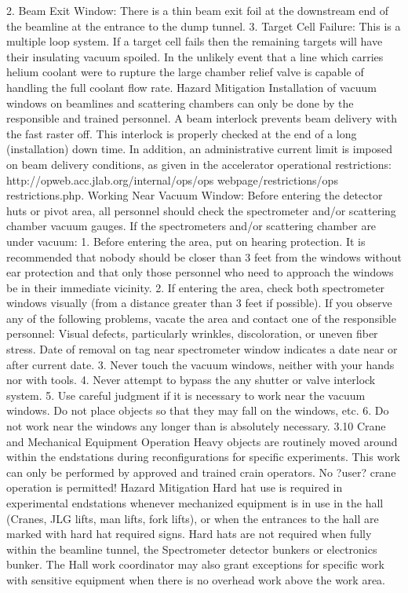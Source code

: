 {	2.  	Beam Exit Window: There is a thin beam exit foil at the downstream end of the beamline at the entrance to the dump tunnel.
	3. 	Target Cell Failure: This is a multiple loop system. If a target cell fails then the remaining targets will have their insulating vacuum spoiled. In the unlikely event that a line which carries helium coolant were to rupture the large chamber relief valve is capable of handling the full coolant flow rate.
Hazard Mitigation	
	Installation of vacuum windows on beamlines and scattering chambers can only be done by the responsible and trained personnel. A beam interlock prevents beam delivery with the fast raster off. This interlock is properly checked at the end of a long (installation) down time. In addition, an administrative current limit is imposed on beam delivery conditions, as given in the accelerator operational restrictions: http://opweb.acc.jlab.org/internal/ops/ops webpage/restrictions/ops restrictions.php.
	Working Near Vacuum Window: Before entering the detector huts or pivot area, all personnel should check the spectrometer and/or scattering chamber vacuum gauges. If the spectrometers and/or scattering chamber are under vacuum:
	1. 	Before entering the area, put on hearing protection. It is recommended that nobody should be closer than 3 feet from the windows without ear protection and that only those personnel who need to approach the windows be in their immediate vicinity.
	2. 	If entering the area, check both spectrometer windows visually (from a distance greater than 3 feet if possible). If you observe any of the following problems, vacate the area and contact one of the responsible personnel: Visual defects, particularly wrinkles, discoloration, or uneven fiber stress. Date of removal on tag near spectrometer window indicates a date near or after current date.
	3. 	Never touch the vacuum windows, neither with your hands nor with tools.
	4. 	Never attempt to bypass the any shutter or valve interlock system.
	5. 	Use careful judgment if it is necessary to work near the vacuum windows. Do not place objects so that they may fall on the windows, etc.
	6.	 Do not work near the windows any longer than is absolutely necessary.
3.10 	Crane and Mechanical Equipment Operation
	Heavy objects are routinely moved around within the endstations during reconfigurations for specific experiments. This work can only be performed by approved and trained crain operators. No ?user? crane operation is permitted!
Hazard Mitigation
	Hard hat use is required in experimental endstations whenever mechanized equipment is in use in the hall (Cranes, JLG lifts, man lifts, fork lifts), or when the entrances to the hall are marked with hard hat required signs. Hard hats are not required when fully within the beamline tunnel, the Spectrometer detector bunkers or electronics bunker. The Hall work coordinator may also grant exceptions for specific work with sensitive equipment when there is no overhead work above the work area.
}
